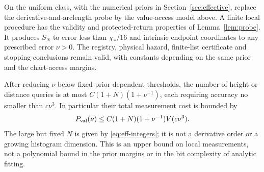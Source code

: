 \begin{theorem}
\label{thm:value-gates}
On the uniform class, with the numerical priors in
Section~\ref{sec:effective}, replace the derivative-and-arclength probe
by the value-access model above. A finite local procedure has the
validity and protected-return properties of Lemma~\ref{lem:probe}.
It produces $S_N$ to error less than $\chi_*/16$ and intrinsic endpoint
coordinates to any prescribed error $\nu>0$. The registry, physical
hazard, finite-list certificate and stopping conclusions remain valid,
with constants depending on the same prior and the chart-access margins.

After reducing $\nu$ below fixed prior-dependent thresholds, the number
of height or distance queries is at most $C(1+N)(1+\nu^{-1})$, each
requiring accuracy no smaller than $c\nu^3$. In particular their total
measurement cost is bounded by
\begin{equation}\label{eq:value-cost}
 P_{\rm val}(\nu)\le C(1+N)(1+\nu^{-1})V(c\nu^3).
\end{equation}
The large but fixed $N$ is given by \eqref{eq:eff-integers}; it is
not a derivative order or a growing histogram dimension. This is an
upper bound on local measurements, not a polynomial bound in the prior
margins or in the bit complexity of analytic fitting.
\end{theorem}
